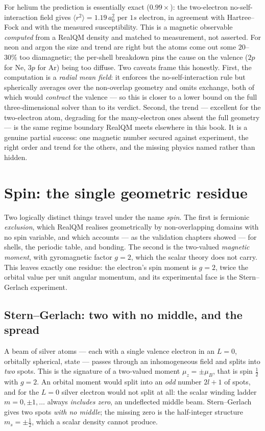 For helium the prediction is essentially exact ($0.99\times$): the two-electron no-self-interaction field gives
$\langle r^2\rangle = 1.19\,a_0^2$ per $1s$ electron, in agreement with Hartree--Fock and with the measured
susceptibility. This is a magnetic observable \emph{computed} from a RealQM density and matched to measurement,
not asserted. For neon and argon the size and trend are right but the atoms come out some $20$--$30\%$ too
diamagnetic; the per-shell breakdown pins the cause on the valence ($2p$ for Ne, $3p$ for Ar) being too diffuse.
Two caveats frame this honestly. First, the computation is a \emph{radial mean field}: it enforces the
no-self-interaction rule but spherically averages over the non-overlap geometry and omits exchange, both of which
would \emph{contract} the valence --- so this is closer to a lower bound on the full three-dimensional solver than
to its verdict. Second, the trend --- excellent for the two-electron atom, degrading for the many-electron ones
absent the full geometry --- is the same regime boundary RealQM meets elsewhere in this book. It is a genuine
partial success: one magnetic number secured against experiment, the right order and trend for the others, and
the missing physics named rather than hidden.

\section{Spin: the single geometric residue}\label{sec:spin-residue}

Two logically distinct things travel under the name \emph{spin}. The first is fermionic \emph{exclusion}, which
RealQM realises geometrically by non-overlapping domains with no spin variable, and which accounts --- as the
validation chapters showed --- for shells, the periodic table, and bonding. The second is the two-valued
\emph{magnetic moment}, with gyromagnetic factor $g = 2$, which the scalar theory does not carry. This leaves
exactly one residue: the electron's spin moment is $g = 2$, twice the orbital value per unit angular momentum,
and its experimental face is the Stern--Gerlach experiment.

\subsection*{Stern--Gerlach: two with no middle, and the spread}

A beam of silver atoms --- each with a single valence electron in an $L = 0$, orbitally spherical, state ---
passes through an inhomogeneous field and splits into \emph{two} spots. This is the signature of a two-valued
moment $\mu_z = \pm\mu_B$, that is spin $\tfrac{1}{2}$ with $g = 2$. An orbital moment would split into an
\emph{odd} number $2l+1$ of spots, and for the $L = 0$ silver electron would not split at all: the scalar winding
ladder $m = 0, \pm 1, \dots$ always \emph{includes zero}, an undeflected middle beam. Stern--Gerlach gives two
spots \emph{with no middle}; the missing zero is the half-integer structure $m_s = \pm\tfrac{1}{2}$, which a
scalar density cannot produce.

